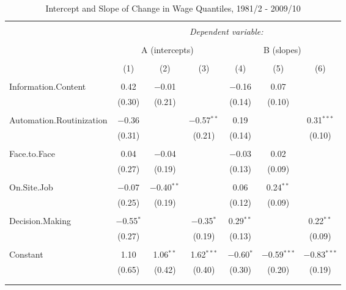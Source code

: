\documentclass{article}
\begin{document}
\begin{table}[!htbp] \centering 
  \caption{Intercept and Slope of Change in Wage Quantiles, 1981/2 - 2009/10} 
  \label{} 
\begin{tabular}{@{\extracolsep{5pt}}lcccccc} 
\\[-1.8ex]\hline 
\hline \\[-1.8ex] 
 & \multicolumn{6}{c}{\textit{Dependent variable:}} \\ 
\cline{2-7} 
\\[-1.8ex] & \multicolumn{3}{c}{A (intercepts)} & \multicolumn{3}{c}{B (slopes)} \\ 
\\[-1.8ex] & (1) & (2) & (3) & (4) & (5) & (6)\\ 
\hline \\[-1.8ex] 
 Information.Content & 0.42 & $-$0.01 &  & $-$0.16 & 0.07 &  \\ 
  & (0.30) & (0.21) &  & (0.14) & (0.10) &  \\ 
  & & & & & & \\ 
 Automation.Routinization & $-$0.36 &  & $-$0.57$^{**}$ & 0.19 &  & 0.31$^{***}$ \\ 
  & (0.31) &  & (0.21) & (0.14) &  & (0.10) \\ 
  & & & & & & \\ 
 Face.to.Face & 0.04 & $-$0.04 &  & $-$0.03 & 0.02 &  \\ 
  & (0.27) & (0.19) &  & (0.13) & (0.09) &  \\ 
  & & & & & & \\ 
 On.Site.Job & $-$0.07 & $-$0.40$^{**}$ &  & 0.06 & 0.24$^{**}$ &  \\ 
  & (0.25) & (0.19) &  & (0.12) & (0.09) &  \\ 
  & & & & & & \\ 
 Decision.Making & $-$0.55$^{*}$ &  & $-$0.35$^{*}$ & 0.29$^{**}$ &  & 0.22$^{**}$ \\ 
  & (0.27) &  & (0.19) & (0.13) &  & (0.09) \\ 
  & & & & & & \\ 
 Constant & 1.10 & 1.06$^{**}$ & 1.62$^{***}$ & $-$0.60$^{*}$ & $-$0.59$^{***}$ & $-$0.83$^{***}$ \\ 
  & (0.65) & (0.42) & (0.40) & (0.30) & (0.20) & (0.19) \\ 
  & & & & & & \\ 
\hline \\[-1.8ex] 

\end{tabular}
\end{table}
\end{document}
